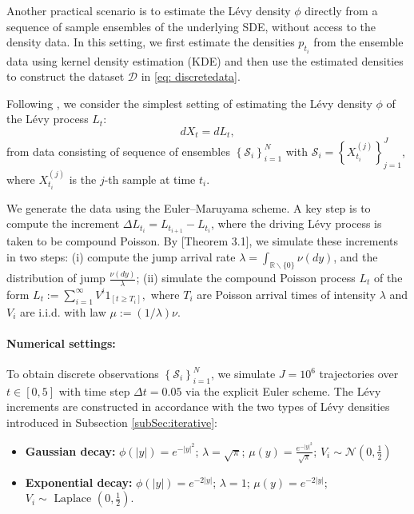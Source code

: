 \documentclass[12pt]{article}
\numberwithin{equation}{section}
\numberwithin{theorem}{section}
\begin{document}
Another practical scenario is to estimate the L\'evy density $\phi$ directly from a sequence of sample ensembles of the underlying SDE, without access to the density data. In this setting, we first estimate the densities $p_{t_i}$ from the ensemble data using kernel density estimation (KDE) and then use the estimated densities to construct the dataset $\mathcal{D}$ in \eqref{eq: discretedata}. 



Following \cite{comte2009nonparametric}, we consider the simplest setting of estimating the L\'evy density $\phi$ of the L\'evy process $L_t$: 
\begin{equation}
\label{eq: SDEexampleone}
d X_t=d L_t,
\end{equation}
from data consisting of sequence of ensembles $\left\{\mathcal{S}_i\right\}_{i=1}^N$ with $\mathcal{S}_i=\left\{X_{t_i}^{(j)}\right\}_{j=1}^J$, where $X_{t_i}^{(j)}$ is the $j$-th sample at time $t_i$. 

We generate the data using the Euler–Maruyama scheme. A key step is to compute the increment $\Delta L_{t_i}=L_{t_{i+1}}-L_{t_i}$, where the driving L\'evy process is taken to be compound Poisson. By \cite{protter1997euler}[Theorem 3.1], we simulate these increments in two steps: (i) compute the jump arrival rate $\lambda= \int_{\mathbb{R} \backslash\{0\}} \nu(d y)$, and the distribution of jump $\frac{\nu(d y)}{\lambda}$; (ii) simulate the compound Poisson process $L_t$ of the form $L_t :=\sum_{i=1}^{\infty} V^i {\mathrm {1}}_{\left[t \geq T_i\right]},$ where $T_i$ are Poisson arrival times of intensity $\lambda$ and $V_i$ are i.i.d. with law $\mu:=(1 / \lambda) \nu$.

\paragraph{Numerical settings:} To obtain discrete observations $\left\{\mathcal{S}_i\right\}_{i=1}^N$, we simulate $J= 10^6$ trajectories over $t \in[0,5]$ with time step $\Delta t=0.05$ via the explicit Euler scheme. The L\'evy increments are constructed in accordance with the two types of L\'evy densities introduced in Subsection \ref{subSec:iterative}:
\begin{itemize}
\item[(a)] \textbf{Gaussian decay:} $\phi(|y|)=e^{-|y|^2}$; $\lambda = \sqrt{\pi}$; $\mu(y) = \frac{e^{-|y|^2}}{\sqrt{\pi}} $; $V_i \sim \mathcal{N}(0, \frac{1}{2})$
\item[(b)] \textbf{Exponential decay:} $\phi(|y|) = e^{-2|y|}$; $\lambda = 1$; $\mu (y)= e^{-2|y|}$; $V_i \sim \text { Laplace }(0, \frac{1}{2})$.
\end{itemize}
\end{document}
